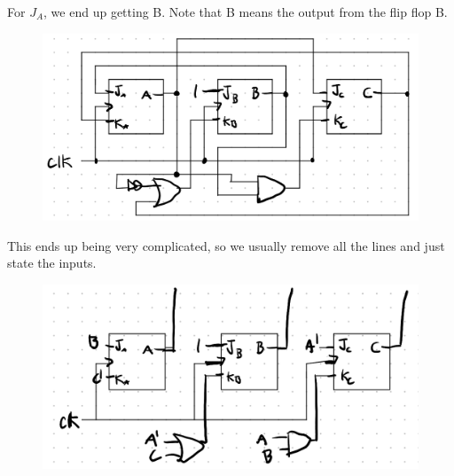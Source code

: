 \documentclass[12pt,letterpaper]{article} \usepackage{amsmath} \usepackage{graphicx}  \usepackage{longtable}  \usepackage{amssymb}
\begin{document}
\begin{mdframed}
            For $J_A$, we end up getting B. Note that B  means the output from the flip flop B. 
            \begin{figure}[H]
                \centering
                \includegraphics[width=0.7\linewidth]{ex8.png}
            \end{figure}
            This ends up being very complicated, so we usually remove all the lines and just state the inputs. 
            \begin{figure}[H]
                \centering
                \includegraphics[width=0.6\linewidth]{ex8-2.png}
            \end{figure}

        \end{mdframed}  
\end{document}
